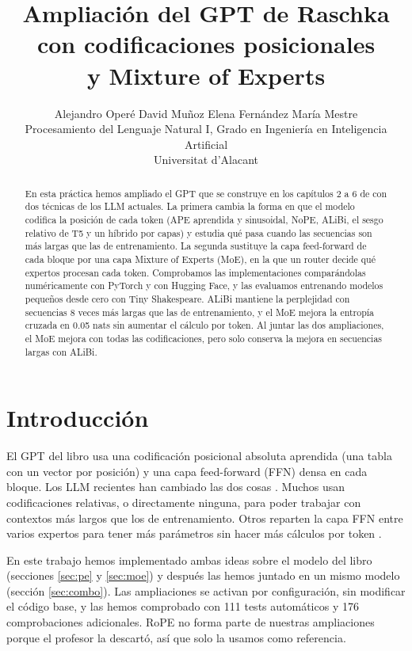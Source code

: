 \documentclass[11pt]{article}
\title{Ampliación del GPT de Raschka con codificaciones posicionales\\y Mixture of Experts}
\author{Alejandro Operé \quad David Muñoz \quad Elena Fernández \quad María Mestre \\
  Procesamiento del Lenguaje Natural I, Grado en Ingeniería en Inteligencia Artificial \\
  Universitat d'Alacant}
\begin{document}
\maketitle

\begin{abstract}
En esta práctica hemos ampliado el GPT que se construye en los capítulos 2 a 6 de \citet{raschka2024build} con dos técnicas de los LLM actuales.
La primera cambia la forma en que el modelo codifica la posición de cada token (APE aprendida y sinusoidal, NoPE, ALiBi, el sesgo relativo de T5 y un híbrido por capas) y estudia qué pasa cuando las secuencias son más largas que las de entrenamiento.
La segunda sustituye la capa feed-forward de cada bloque por una capa Mixture of Experts (MoE), en la que un router decide qué expertos procesan cada token.
Comprobamos las implementaciones comparándolas numéricamente con PyTorch y con Hugging Face, y las evaluamos entrenando modelos pequeños desde cero con Tiny Shakespeare.
ALiBi mantiene la perplejidad con secuencias 8 veces más largas que las de entrenamiento, y el MoE mejora la entropía cruzada en 0.05 nats sin aumentar el cálculo por token.
Al juntar las dos ampliaciones, el MoE mejora con todas las codificaciones, pero solo conserva la mejora en secuencias largas con ALiBi.
\end{abstract}

\section{Introducción}
El GPT del libro usa una codificación posicional absoluta aprendida (una tabla con un vector por posición) y una capa feed-forward (FFN) densa en cada bloque.
Los LLM recientes han cambiado las dos cosas \citep{raschka2025comparison}.
Muchos usan codificaciones relativas, o directamente ninguna, para poder trabajar con contextos más largos que los de entrenamiento.
Otros reparten la capa FFN entre varios expertos para tener más parámetros sin hacer más cálculos por token \citep{shazeer2017outrageously,lepikhin2021gshard,fedus2022switch,jiang2024mixtral}.

En este trabajo hemos implementado ambas ideas sobre el modelo del libro (secciones \ref{sec:pe} y \ref{sec:moe}) y después las hemos juntado en un mismo modelo (sección \ref{sec:combo}).
Las ampliaciones se activan por configuración, sin modificar el código base, y las hemos comprobado con 111 tests automáticos y 176 comprobaciones adicionales.
RoPE \citep{su2024roformer} no forma parte de nuestras ampliaciones porque el profesor la descartó, así que solo la usamos como referencia.
\end{document}

